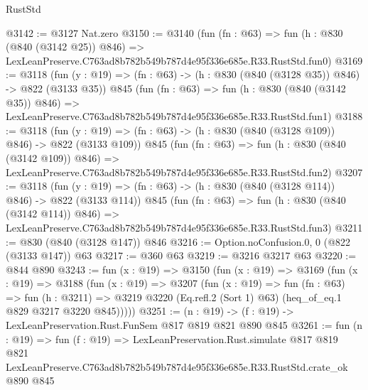 \begin{lexlean}{RustStd}
\begin{coremodule}
@3142 := @3127 Nat.zero
@3150 := @3140
    (fun (fn : @63) =>
    fun (h : @830 (@840 (@3142 @25)) @846) =>
    LexLeanPreserve.C763ad8b782b549b787d4e95f336e685e.R33.RustStd.fun0)
@3169 := @3118
    (fun (y : @19) => (fn : @63) -> (h : @830 (@840 (@3128 @35)) @846) -> @822 (@3133 @35))
    @845
    (fun (fn : @63) =>
    fun (h : @830 (@840 (@3142 @35)) @846) =>
    LexLeanPreserve.C763ad8b782b549b787d4e95f336e685e.R33.RustStd.fun1)
@3188 := @3118
    (fun (y : @19) => (fn : @63) -> (h : @830 (@840 (@3128 @109)) @846) -> @822 (@3133 @109))
    @845
    (fun (fn : @63) =>
    fun (h : @830 (@840 (@3142 @109)) @846) =>
    LexLeanPreserve.C763ad8b782b549b787d4e95f336e685e.R33.RustStd.fun2)
@3207 := @3118
    (fun (y : @19) => (fn : @63) -> (h : @830 (@840 (@3128 @114)) @846) -> @822 (@3133 @114))
    @845
    (fun (fn : @63) =>
    fun (h : @830 (@840 (@3142 @114)) @846) =>
    LexLeanPreserve.C763ad8b782b549b787d4e95f336e685e.R33.RustStd.fun3)
@3211 := @830 (@840 (@3128 @147)) @846
@3216 := Option.noConfusion.{0, 0} (@822 (@3133 @147)) @63
@3217 := @360 @63
@3219 := @3216 @3217 @63
@3220 := @844 @890
@3243 := fun (x : @19) =>
  @3150
    (fun (x : @19) =>
    @3169
      (fun (x : @19) =>
      @3188
        (fun (x : @19) =>
        @3207
          (fun (x : @19) =>
          fun (fn : @63) =>
          fun (h : @3211) =>
          @3219 @3220 (Eq.refl.{2} (Sort 1) @63) (heq_of_eq.{1} @829 @3217 @3220 @845)))))
@3251 := (n : @19) -> (f : @19) -> LexLeanPreservation.Rust.FunSem @817 @819 @821 @890 @845
@3261 := fun (n : @19) =>
  fun (f : @19) =>
  LexLeanPreservation.Rust.simulate
    @817
    @819
    @821
    LexLeanPreserve.C763ad8b782b549b787d4e95f336e685e.R33.RustStd.crate_ok
    @890
    @845
\end{coremodule}
\end{lexlean}
